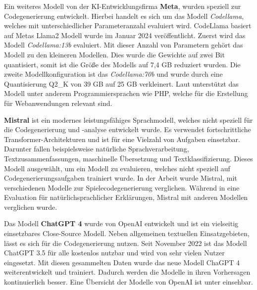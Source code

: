 Ein weiteres Modell von der KI-Entwicklungsfirma \textbf{Meta}, wurden speziell zur Codegenerierung entwickelt. Hierbei handelt es sich um das Modell \textit{Codellama}, welches mit unterschiedlicher Parameteranzahl evaluiert wird. CodeLlama basiert auf Metas Llama2 Modell wurde im Januar 2024 veröffentlicht.
Zuerst wird das Modell \textit{Codellama:13b} evaluiert. Mit dieser Anzahl von Parametern gehört das Modell zu den kleineren Modellen. Dies wurde die Gewichte auf zwei Bit quantisiert, somit ist die Größe des Modells auf 7,4 GB reduziert wurden.
Die zweite Modellkonfiguration ist das \textit{Codellama:70b} und wurde durch eine Quantisierung Q2\_K von 39 GB auf 25 GB verkleinert. Laut \cite{meta-2023} unterstützt das Modell unter anderem Programmiersprachen wie PHP, welche für die Erstellung für Webanwendungen relevant sind.\vspace{0.2cm}

\textbf{Mistral} ist ein modernes leistungsfähiges Sprachmodell, welches nicht speziell für die Codegenerierung und -analyse entwickelt wurde. Es verwendet fortschrittliche Transformer-Architekturen und ist für eine Vielzahl von Aufgaben einsetzbar. Darunter fallen beispielsweise natürliche Sprachverarbeitung, Textzusammenfassungen, maschinelle Übersetzung und Textklassifizierung. Dieses Modell ausgewählt, um ein Modell zu evaluieren, welches nicht speziell auf Codegenerierungsaufgaben trainiert wurde. In der Arbeit \cite{eberhardinger-2024} wurde Mistral, mit verschiedenen Modelle zur Spielecodegenerierung verglichen. Während in \cite{quan-2024} eine Evaluation für natürlichsprachlicher Erklärungen, Mistral mit anderen Modellen verglichen wurde.\vspace{0.2cm}

Das Modell \textbf{ChatGPT 4} wurde von OpenAI entwickelt und ist ein vielseitig einsetzbares Close-Source Modell. Neben allgemeinen textuellen Einsatzgebieten, lässt es sich für die Codegenerierung nutzen. Seit November 2022 ist das Modell ChatGPT 3.5 für alle kostenlos nutzbar und wird von sehr vielen Nutzer eingesetzt. Mit diesen gesammelten Daten wurde das neue Modell ChaGPT 4 weiterentwickelt und trainiert. Dadurch werden die Modelle in ihren Vorhersagen kontinuierlich besser. Eine Übersicht der Modelle von OpenAI ist unter \cite{openai_model_overview} einsehbar.\vspace{0.2cm}

